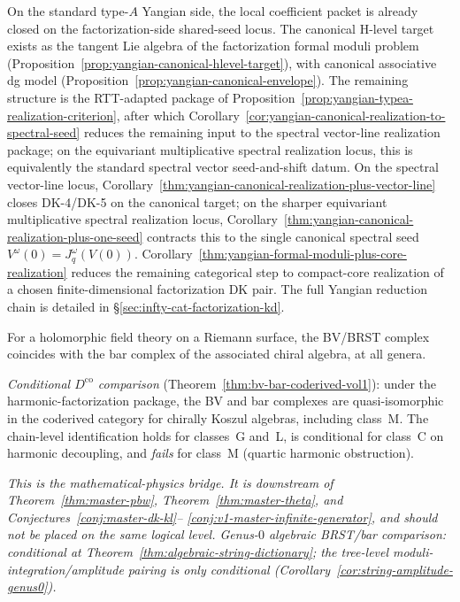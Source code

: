 \begin{remark}
On the standard type-$A$ Yangian side, the local coefficient packet is
already closed on the factorization-side shared-seed locus. The
canonical H-level target exists as the tangent Lie algebra of the
factorization formal moduli problem
(Proposition~\ref{prop:yangian-canonical-hlevel-target}), with
canonical associative dg model
(Proposition~\ref{prop:yangian-canonical-envelope}). The remaining
structure is the RTT-adapted package of
Proposition~\ref{prop:yangian-typea-realization-criterion}, after
which
Corollary~\ref{cor:yangian-canonical-realization-to-spectral-seed}
reduces the remaining input to the spectral vector-line realization
package; on the equivariant multiplicative spectral realization locus,
this is equivalently the standard spectral vector seed-and-shift
datum. On the spectral vector-line locus,
Corollary~\ref{thm:yangian-canonical-realization-plus-vector-line}
closes DK-4/DK-5 on the canonical target; on the sharper equivariant
multiplicative spectral realization locus,
Corollary~\ref{thm:yangian-canonical-realization-plus-one-seed}
contracts this to the single canonical spectral seed
$V^\omega(0)=J_q^\omega(V(0))$.
Corollary~\ref{thm:yangian-formal-moduli-plus-core-realization}
reduces the remaining categorical step to compact-core realization of
a chosen finite-dimensional factorization DK pair. The full
Yangian reduction chain is detailed in \S\ref{sec:infty-cat-factorization-kd}.
\end{remark}

\label{conj:master-bv-brst}%
\begin{conjecture}
\label{conj:v1-master-bv-brst}
\ClaimStatusConjectured{}
For a holomorphic field theory on a Riemann surface, the BV/BRST
complex coincides with the bar complex of the associated chiral algebra,
at all genera.

\emph{Conditional $D^{\mathrm{co}}$ comparison}
\textup{(}Theorem~\textup{\ref{thm:bv-bar-coderived-vol1}}\textup{)}:
under the harmonic-factorization package, the BV and bar complexes are
quasi-isomorphic in the coderived category for chirally Koszul
algebras, including class~M.
The chain-level identification holds for classes~G and~L, is
conditional for class~C on harmonic decoupling, and
\emph{fails} for class~M
\textup{(}quartic harmonic obstruction\textup{)}.

\emph{This is the mathematical-physics bridge. It is
downstream of Theorem~\textup{\ref{thm:master-pbw}},
Theorem~\textup{\ref{thm:master-theta}}, and
Conjectures~\textup{\ref{conj:master-dk-kl}}--\textup{%
\ref{conj:v1-master-infinite-generator}}, and should not be placed on the
same logical level. Genus-$0$ algebraic BRST/bar comparison: conditional
at Theorem~\textup{\ref{thm:algebraic-string-dictionary}}; the
tree-level moduli-integration/amplitude pairing is only conditional
\textup{(}Corollary~\textup{\ref{cor:string-amplitude-genus0})}.}
\end{conjecture}


